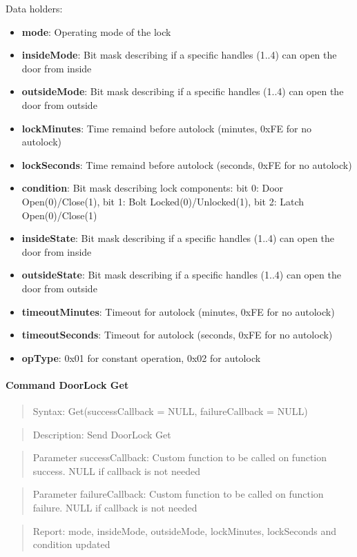 \noindent
Data holders:

\begin{itemize}
\item \textbf{mode}: Operating mode of the lock
\item \textbf{insideMode}: Bit mask describing if a specific handles (1..4) can open the door from inside
\item \textbf{outsideMode}: Bit mask describing if a specific handles (1..4) can open the door from outside
\item \textbf{lockMinutes}: Time remaind before autolock (minutes, 0xFE for no autolock)
\item \textbf{lockSeconds}: Time remaind before autolock (seconds, 0xFE for no autolock)
\item \textbf{condition}: Bit mask describing lock components: bit 0: Door Open(0)/Close(1), bit 1: Bolt Locked(0)/Unlocked(1), bit 2: Latch Open(0)/Close(1)
\item \textbf{insideState}: Bit mask describing if a specific handles (1..4) can open the door from inside
\item \textbf{outsideState}: Bit mask describing if a specific handles (1..4) can open the door from outside
\item \textbf{timeoutMinutes}: Timeout for autolock (minutes, 0xFE for no autolock)
\item \textbf{timeoutSeconds}: Timeout for autolock (seconds, 0xFE for no autolock)
\item \textbf{opType}: 0x01 for constant operation, 0x02 for autolock
\end{itemize}

\paragraph{Command DoorLock Get}
\begin{quote}Syntax: Get(successCallback = NULL, failureCallback = NULL)\end{quote}
\begin{quote}Description: Send DoorLock Get\end{quote}
\begin{quote}Parameter successCallback: Custom function to be called on function success. NULL if callback is not needed\end{quote}
\begin{quote}Parameter failureCallback: Custom function to be called on function failure. NULL if callback is not needed\end{quote}
\begin{quote}Report: mode, insideMode, outsideMode, lockMinutes, lockSeconds and condition updated\end{quote}

